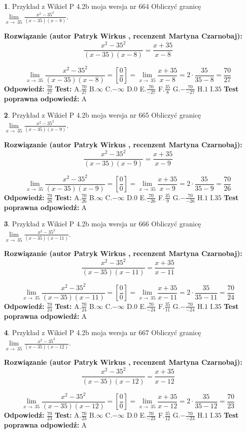 \documentclass[12pt, a4paper]{article}
\theoremstyle{definition} %
\newtheorem{zad}{}
\newcommand{\zadStart}[1]{\begin{zad}#1\newline}
\newcommand{\zadStop}{\end{zad}}
\newcommand{\rozwStart}[2]{\noindent \textbf{Rozwiązanie (autor #1 , recenzent #2): }\newline}
\newcommand{\rozwStop}{\newline}
\newcommand{\odpStart}{\noindent \textbf{Odpowiedź:}\newline}
\newcommand{\odpStop}{\newline}
\newcommand{\testStart}{\noindent \textbf{Test:}\newline}
\newcommand{\testStop}{\newline}
\newcommand{\kluczStart}{\noindent \textbf{Test poprawna odpowiedź:}\newline}
\newcommand{\kluczStop}{\newline}
\begin{document}
\zadStart{Przykład z Wikieł P 4.2b moja wersja nr 664}
Obliczyć granicę $\lim\limits_{x\to\ 35}\frac{x^{2}-35^{2}}{(x-35)(x-8)}$.
\zadStop
\rozwStart{Patryk Wirkus}{Martyna Czarnobaj}
$$\frac{x^{2}-35^{2}}{(x-35)(x-8)}=\frac{x+35}{x-8}$$

$$\lim\limits_{x\to\ 35}\frac{x^{2}-35^{2}}{(x-35)(x-8)}=[\frac{0}{0}]=\lim\limits_{x\to\ 35}\frac{x+35}{x-8}=2 \cdot \frac{35}{35-8} = \frac{70}{27}$$
\rozwStop
\odpStart
$\frac{70}{27}$
\odpStop
\testStart
A.$\frac{70}{27}$
B.$\infty$
C.$-\infty$
D.$0$
E.$\frac{70}{-27}$
F.$\frac{35}{8}$
G.$-\frac{70}{-27}$
H.$1$
I.$35$
\testStop
\kluczStart
A
\kluczStop



\zadStart{Przykład z Wikieł P 4.2b moja wersja nr 665}
Obliczyć granicę $\lim\limits_{x\to\ 35}\frac{x^{2}-35^{2}}{(x-35)(x-9)}$.
\zadStop
\rozwStart{Patryk Wirkus}{Martyna Czarnobaj}
$$\frac{x^{2}-35^{2}}{(x-35)(x-9)}=\frac{x+35}{x-9}$$

$$\lim\limits_{x\to\ 35}\frac{x^{2}-35^{2}}{(x-35)(x-9)}=[\frac{0}{0}]=\lim\limits_{x\to\ 35}\frac{x+35}{x-9}=2 \cdot \frac{35}{35-9} = \frac{70}{26}$$
\rozwStop
\odpStart
$\frac{70}{26}$
\odpStop
\testStart
A.$\frac{70}{26}$
B.$\infty$
C.$-\infty$
D.$0$
E.$\frac{70}{-26}$
F.$\frac{35}{9}$
G.$-\frac{70}{-26}$
H.$1$
I.$35$
\testStop
\kluczStart
A
\kluczStop



\zadStart{Przykład z Wikieł P 4.2b moja wersja nr 666}
Obliczyć granicę $\lim\limits_{x\to\ 35}\frac{x^{2}-35^{2}}{(x-35)(x-11)}$.
\zadStop
\rozwStart{Patryk Wirkus}{Martyna Czarnobaj}
$$\frac{x^{2}-35^{2}}{(x-35)(x-11)}=\frac{x+35}{x-11}$$

$$\lim\limits_{x\to\ 35}\frac{x^{2}-35^{2}}{(x-35)(x-11)}=[\frac{0}{0}]=\lim\limits_{x\to\ 35}\frac{x+35}{x-11}=2 \cdot \frac{35}{35-11} = \frac{70}{24}$$
\rozwStop
\odpStart
$\frac{70}{24}$
\odpStop
\testStart
A.$\frac{70}{24}$
B.$\infty$
C.$-\infty$
D.$0$
E.$\frac{70}{-24}$
F.$\frac{35}{11}$
G.$-\frac{70}{-24}$
H.$1$
I.$35$
\testStop
\kluczStart
A
\kluczStop



\zadStart{Przykład z Wikieł P 4.2b moja wersja nr 667}
Obliczyć granicę $\lim\limits_{x\to\ 35}\frac{x^{2}-35^{2}}{(x-35)(x-12)}$.
\zadStop
\rozwStart{Patryk Wirkus}{Martyna Czarnobaj}
$$\frac{x^{2}-35^{2}}{(x-35)(x-12)}=\frac{x+35}{x-12}$$

$$\lim\limits_{x\to\ 35}\frac{x^{2}-35^{2}}{(x-35)(x-12)}=[\frac{0}{0}]=\lim\limits_{x\to\ 35}\frac{x+35}{x-12}=2 \cdot \frac{35}{35-12} = \frac{70}{23}$$
\rozwStop
\odpStart
$\frac{70}{23}$
\odpStop
\testStart
A.$\frac{70}{23}$
B.$\infty$
C.$-\infty$
D.$0$
E.$\frac{70}{-23}$
F.$\frac{35}{12}$
G.$-\frac{70}{-23}$
H.$1$
I.$35$
\testStop
\kluczStart
A
\kluczStop
\end{document}
